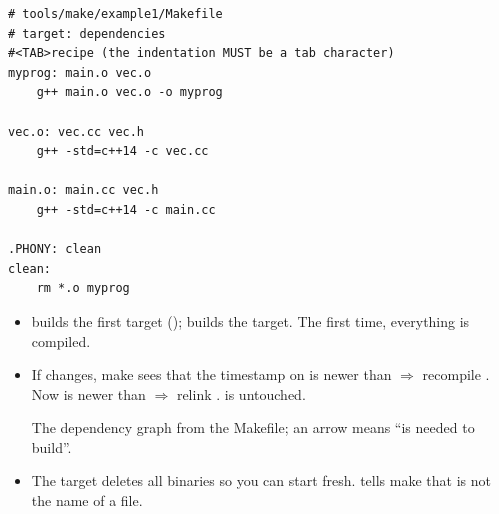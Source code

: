 \begin{lstlisting}[style=bash]
# tools/make/example1/Makefile
# target: dependencies
#<TAB>recipe (the indentation MUST be a tab character)
myprog: main.o vec.o
	g++ main.o vec.o -o myprog

vec.o: vec.cc vec.h
	g++ -std=c++14 -c vec.cc

main.o: main.cc vec.h
	g++ -std=c++14 -c main.cc

.PHONY: clean
clean:
	rm *.o myprog
\end{lstlisting}

\begin{itemize}
  \item {} builds the first target (); 
        builds the  target. The first time, everything is compiled.
  \item If  changes, make sees that the timestamp on 
        is newer than  $\Rightarrow$ recompile . Now
         is newer than  $\Rightarrow$ relink
        .  is untouched.
\begin{center}

\small The dependency graph from the Makefile; an arrow means ``is needed to build''.
\end{center}
  \item The  target deletes all binaries so you can start fresh.
         tells make that  is not the name of a file.
\end{itemize}

